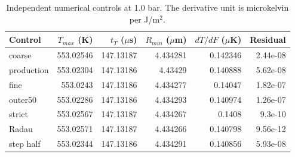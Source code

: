 \begin{table}[H]\centering\small
\begin{tabular}{lrrrrr}
\toprule
Control & $T_{max}$ (K) & $t_T$ ($\mu$s) & $R_{min}$ ($\mu$m) & $dT/dF$ ($\mu$K) & Residual \\ \midrule
coarse & 553.02546 & 147.13187 & 4.434281 & 0.142346 & 2.44e-08 \\
production & 553.02304 & 147.13186 & 4.43429 & 0.140888 & 5.62e-08 \\
fine & 553.0243 & 147.13186 & 4.434277 & 0.14047 & 1.82e-07 \\
outer50 & 553.02286 & 147.13186 & 4.434293 & 0.140974 & 1.26e-07 \\
strict & 553.02567 & 147.13187 & 4.434267 & 0.1408 & 9.3e-10 \\
Radau & 553.02571 & 147.13187 & 4.434266 & 0.140798 & 9.56e-12 \\
step half & 553.02344 & 147.13186 & 4.434291 & 0.140856 & 5.93e-08 \\
\bottomrule\end{tabular}
\caption{Independent numerical controls at 1.0 bar. The derivative unit is microkelvin per J/m$^2$.}
\end{table}
